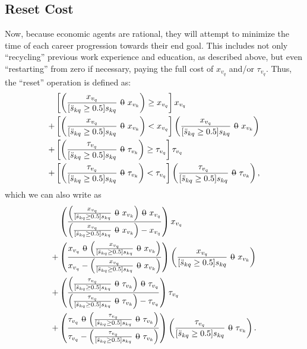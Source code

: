 \documentclass[12pt, a4paper]{article}
\makeatletter
\newcommand{\superimpose}[2]{{
  \ooalign{
    \hfil$\m@th#1\@firstoftwo#2$\hfil\cr
    \hfil$\m@th#1\@secondoftwo#2$\hfil\cr
  }
}}
\newcommand{\stack}[2]{\mathbin{\mathpalette\superimpose{{#1}{#2}}}}
\newcommand{\minuszero}{\stack{0}{-}}
\makeatother
\begin{document}
\subsection{Reset Cost}
Now, because economic agents are rational, they will attempt to minimize the
time of each career progression towards their end goal. This includes not only
``recycling'' previous work experience and education, as described above, but
even ``restarting'' from zero if necessary, paying the full cost of $x_{v_q}$
and/or $\tau_{v_q}$. Thus, the ``reset'' operation is defined as:
\begin{align}
   &
  \left[
    \left(
    \frac{x_{v_q}}{[\ddot{s}_{kq} \geq 0.5] s_{kq}}
    \minuszero
    x_{v_k}
    \right)
    \geq
    x_{v_q}
    \right]
  x_{v_q}
  \\                +
   & \left[
    \left(
    \frac{x_{v_q}}{[\ddot{s}_{kq} \geq 0.5] s_{kq}}
    \minuszero
    x_{v_k}
    \right)
    <
    x_{v_q}
    \right]
  \left(
  \frac{x_{v_q}}{[\ddot{s}_{kq} \geq 0.5] s_{kq}}
  \minuszero
  x_{v_k}
  \right)
  \\       +
   & \left[
    \left(
    \frac{\tau_{v_q}}{[\ddot{s}_{kq} \geq 0.5] s_{kq}}
    \minuszero
    \tau_{v_k}
    \right)
    \geq
    \tau_{v_q}
    \right]
  \tau_{v_q}
  \\                +
   & \left[
    \left(
    \frac{\tau_{v_q}}{[\ddot{s}_{kq} \geq 0.5] s_{kq}}
    \minuszero
    \tau_{v_k}
    \right)
    <
    \tau_{v_q}
    \right]
  \left(
  \frac{\tau_{v_q}}{[\ddot{s}_{kq} \geq 0.5] s_{kq}}
  \minuszero
  \tau_{v_k}
  \right)
  ,
\end{align}
which we can also write as
\begin{align*}
   &
  \left(
  \frac{
    \left(
    \frac{x_{v_q}}{[\ddot{s}_{kq} \geq 0.5] s_{kq}}
    \minuszero
    x_{v_k}
    \right)
    \minuszero
    x_{v_q}
  }{
    \left(
    \frac{x_{v_q}}{[\ddot{s}_{kq} \geq 0.5] s_{kq}}
    \minuszero
    x_{v_k}
    \right)
    -
    x_{v_q}
  }
  \right)
  x_{v_q}
  \\+
   & \left(
  \frac{
    x_{v_q}
    \minuszero
    \left(
    \frac{x_{v_q}}{[\ddot{s}_{kq} \geq 0.5] s_{kq}}
    \minuszero
    x_{v_k}
    \right)
  }{
    x_{v_q}
    -
    \left(
    \frac{x_{v_q}}{[\ddot{s}_{kq} \geq 0.5] s_{kq}}
    \minuszero
    x_{v_k}
    \right)
  }
  \right)
  \left(
  \frac{x_{v_q}}{[\ddot{s}_{kq} \geq 0.5] s_{kq}}
  \minuszero
  x_{v_k}
  \right)
  \\ + &
     \left(
     \frac{
       \left(
       \frac{\tau_{v_q}}{[\ddot{s}_{kq} \geq 0.5] s_{kq}}
       \minuszero
       \tau_{v_k}
       \right)
    \minuszero
       \tau_{v_q}
  }{
       \left(
       \frac{\tau_{v_q}}{[\ddot{s}_{kq} \geq 0.5] s_{kq}}
       \minuszero
       \tau_{v_k}
       \right)
    -
       \tau_{v_q}
  }
     \right)
  \tau_{v_q}
  \\+
   & \left(
  \frac{
    \tau_{v_q}
    \minuszero
    \left(
    \frac{\tau_{v_q}}{[\ddot{s}_{kq} \geq 0.5] s_{kq}}
    \minuszero
    \tau_{v_k}
    \right)
  }{
    \tau_{v_q}
    -
    \left(
    \frac{\tau_{v_q}}{[\ddot{s}_{kq} \geq 0.5] s_{kq}}
    \minuszero
    \tau_{v_k}
    \right)
  }
  \right)
  \left(
  \frac{\tau_{v_q}}{[\ddot{s}_{kq} \geq 0.5] s_{kq}}
  \minuszero
  \tau_{v_k}
  \right)
  .
\end{align*}
\end{document}
